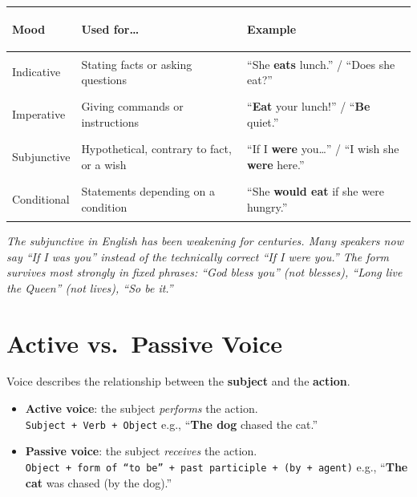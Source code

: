 \documentclass[11pt, letterpaper]{article}
\begin{document}
\noindent
{\renewcommand{\arraystretch}{1.5}
\begin{tabularx}{\textwidth}{>{\bfseries\raggedright\arraybackslash}p{3cm}
                              >{\raggedright\arraybackslash}X
                              >{\raggedright\arraybackslash}p{4cm}}
\toprule
\rowcolor{tableheaderorange}
\textbf{Mood} & \textbf{Used for\ldots} & \textbf{Example} \\
\midrule
\rowcolor{rowOr} Indicative   & Stating facts or asking questions             & ``She \textbf{eats} lunch.'' / ``Does she eat?'' \\
\rowcolor{rowA}  Imperative   & Giving commands or instructions               & ``\textbf{Eat} your lunch!'' / ``\textbf{Be} quiet.'' \\
\rowcolor{rowOr} Subjunctive  & Hypothetical, contrary to fact, or a wish     & ``If I \textbf{were} you\ldots'' / ``I wish she \textbf{were} here.'' \\
\rowcolor{rowA}  Conditional  & Statements depending on a condition            & ``She \textbf{would eat} if she were hungry.'' \\
\bottomrule
\end{tabularx}}

\textit{The subjunctive in English has been weakening for centuries. Many speakers now say ``If I was you'' instead of the technically correct ``If I were you.'' The form survives most strongly in fixed phrases: ``God bless you'' (not blesses), ``Long live the Queen'' (not lives), ``So be it.''}

\section*{Active vs.\ Passive Voice}

Voice describes the relationship between the \textbf{subject} and the \textbf{action}.

\begin{itemize}[noitemsep]
  \item \textbf{Active voice}: the subject \emph{performs} the action.\\
  \texttt{Subject + Verb + Object} \quad e.g., ``\textbf{The dog} chased the cat.''
  \item \textbf{Passive voice}: the subject \emph{receives} the action.\\
  \texttt{Object + form of ``to be'' + past participle + (by + agent)} \quad e.g., ``\textbf{The cat} was chased (by the dog).''
\end{itemize}
\end{document}
